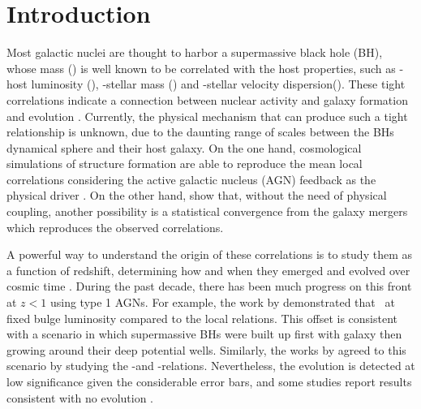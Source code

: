 \documentclass[apj]{emulateapj}
\begin{document}

\section{Introduction}
\label{sec:introduction}

Most galactic nuclei are thought to harbor a supermassive black hole (BH), whose mass (\mbh) is well known to be correlated with the host properties, such as \mbh-host luminosity (\lhost), \mbh-stellar mass (\smass) and \mbh-stellar velocity dispersion(\sigstar). These tight correlations indicate a connection between nuclear activity and galaxy formation and evolution \citep[e.g.,][]{Mag++98, F+M00, M+H03, Gul++09,Beifi2012, H+R04, Geb++01b, Gra++2011}.
Currently, the physical mechanism that can produce such a tight relationship is unknown, due to the daunting range of scales between the BHs dynamical sphere and their host galaxy. On the one hand, cosmological simulations of structure formation are able to reproduce the mean local correlations considering the active galactic nucleus (AGN) feedback as the physical driver \citep{Springel2005, Hopkins2008, Matteo2008, DeG++15}.
On the other hand, \citet{Peng2007, Jahnke2011, Hirschmann2010} show that, without the need of physical coupling, another possibility is a statistical convergence from the galaxy mergers which reproduces the observed correlations.

A powerful way to understand the origin of these correlations is to study them as a function of redshift, determining how and when they emerged and evolved over cosmic time \citep[e.g.,][]{TMB04,Sal++06,Woo++06, Jah++09,SS13}. During the past decade, there has been much progress on this front at $z<1$ using type 1 AGNs. For example, the work by \citet{Park15, Tre++07, Pen++06qsob} demonstrated that \mbh\ at fixed bulge luminosity compared to the local relations. This offset is consistent with a scenario in which supermassive BHs were built up first with galaxy then growing around their deep potential wells. Similarly, the works by \citet{Bennert11, Woo++08} agreed to this scenario by studying the \mbh-\smass and \mbh-\sigstar relations. Nevertheless, the evolution is detected at low significance given the considerable error bars, and some studies report results consistent with no evolution \citet{SS13, Sun2015, Cisternas2011}.
\end{document}
